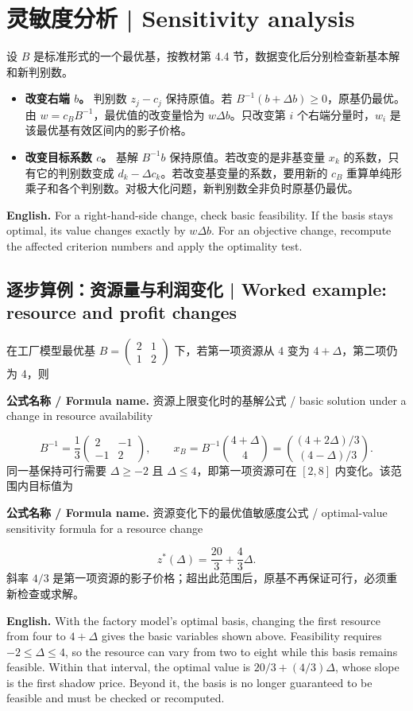 \documentclass[UTF8,11pt,a4paper]{ctexart}
\newcommand{\EN}[1]{\par\noindent \textbf{English.} #1\par}
\newcommand{\FORMULA}[2]{\par\noindent\textbf{公式名称 / Formula name.} #1 / #2\par}
\begin{document}
\section{灵敏度分析 | Sensitivity analysis}
\noindent 设 $B$ 是标准形式的一个最优基，按教材第 4.4 节，数据变化后分别检查新基本解和新判别数。
\begin{itemize}
\item \textbf{改变右端 $b$。} 判别数 $z_j-c_j$ 保持原值。若 $B^{-1}(b+\Delta b)\ge0$，原基仍最优。由 $w=c_BB^{-1}$，最优值的改变量恰为 $w\Delta b$。只改变第 $i$ 个右端分量时，$w_i$ 是该最优基有效区间内的影子价格。
\item \textbf{改变目标系数 $c$。} 基解 $B^{-1}b$ 保持原值。若改变的是非基变量 $x_k$ 的系数，只有它的判别数变成 $d_k-\Delta c_k$。若改变基变量的系数，要用新的 $c_B$ 重算单纯形乘子和各个判别数。对极大化问题，新判别数全非负时原基仍最优。
\end{itemize}
\EN{For a right-hand-side change, check basic feasibility. If the basis stays optimal, its value changes exactly by $w\Delta b$. For an objective change, recompute the affected criterion numbers and apply the optimality test.}

\subsection{逐步算例：资源量与利润变化 | Worked example: resource and profit changes}
在工厂模型最优基 $B=\begin{pmatrix}2&1\\1&2\end{pmatrix}$ 下，若第一项资源从 $4$ 变为 $4+\Delta$，第二项仍为 $4$，则
\FORMULA{资源上限变化时的基解公式}{basic solution under a change in resource availability}
\[
B^{-1}=\frac13\begin{pmatrix}2&-1\\-1&2\end{pmatrix},\qquad
x_B=B^{-1}\binom{4+\Delta}{4}
=\binom{(4+2\Delta)/3}{(4-\Delta)/3}.
\]
同一基保持可行需要 $\Delta\ge-2$ 且 $\Delta\le4$，即第一项资源可在 $[2,8]$ 内变化。该范围内目标值为
\FORMULA{资源变化下的最优值敏感度公式}{optimal-value sensitivity formula for a resource change}
\[
z^*(\Delta)=\frac{20}{3}+\frac43\Delta.
\]
斜率 $4/3$ 是第一项资源的影子价格；超出此范围后，原基不再保证可行，必须重新检查或求解。
\EN{With the factory model's optimal basis, changing the first resource from four to $4+\Delta$ gives the basic variables shown above. Feasibility requires $-2\le\Delta\le4$, so the resource can vary from two to eight while this basis remains feasible. Within that interval, the optimal value is $20/3+(4/3)\Delta$, whose slope is the first shadow price. Beyond it, the basis is no longer guaranteed to be feasible and must be checked or recomputed.}
\end{document}
